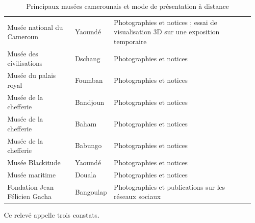 \begin{table}[!ht]
\centering
\caption{Principaux musées camerounais et mode de présentation à distance}
\label{tab:museescmr}
\small
\begin{tabularx}{\textwidth}{|L{4.6cm}|L{2.6cm}|X|}
\hline
{}
 &  &  \\ \hline
Musée national du Cameroun & Yaoundé & Photographies et notices ; essai de visualisation 3D sur une exposition temporaire \\ \hline
Musée des civilisations & Dschang & Photographies et notices \\ \hline
Musée du palais royal & Foumban & Photographies et notices \\ \hline
Musée de la chefferie & Bandjoun & Photographies et notices \\ \hline
Musée de la chefferie & Baham & Photographies et notices \\ \hline
Musée de la chefferie & Babungo & Photographies et notices \\ \hline
Musée Blackitude & Yaoundé & Photographies et notices \\ \hline
Musée maritime & Douala & Photographies et notices \\ \hline
Fondation Jean Félicien Gacha & Bangoulap & Photographies et publications sur les réseaux sociaux \\ \hline
\end{tabularx}
\end{table}


Ce relevé appelle trois constats.

